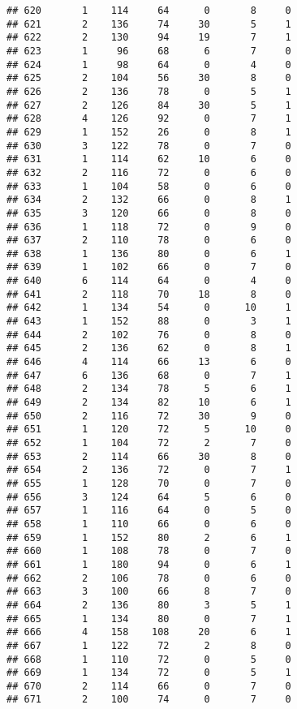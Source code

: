 \documentclass[
]{article}
\begin{document}
\begin{verbatim}
## 620       1    114     64      0       8     0
## 621       2    136     74     30       5     1
## 622       2    130     94     19       7     1
## 623       1     96     68      6       7     0
## 624       1     98     64      0       4     0
## 625       2    104     56     30       8     0
## 626       2    136     78      0       5     1
## 627       2    126     84     30       5     1
## 628       4    126     92      0       7     1
## 629       1    152     26      0       8     1
## 630       3    122     78      0       7     0
## 631       1    114     62     10       6     0
## 632       2    116     72      0       6     0
## 633       1    104     58      0       6     0
## 634       2    132     66      0       8     1
## 635       3    120     66      0       8     0
## 636       1    118     72      0       9     0
## 637       2    110     78      0       6     0
## 638       1    136     80      0       6     1
## 639       1    102     66      0       7     0
## 640       6    114     64      0       4     0
## 641       2    118     70     18       8     0
## 642       1    134     54      0      10     1
## 643       1    152     88      0       3     1
## 644       2    102     76      0       8     0
## 645       2    136     62      0       8     1
## 646       4    114     66     13       6     0
## 647       6    136     68      0       7     1
## 648       2    134     78      5       6     1
## 649       2    134     82     10       6     1
## 650       2    116     72     30       9     0
## 651       1    120     72      5      10     0
## 652       1    104     72      2       7     0
## 653       2    114     66     30       8     0
## 654       2    136     72      0       7     1
## 655       1    128     70      0       7     0
## 656       3    124     64      5       6     0
## 657       1    116     64      0       5     0
## 658       1    110     66      0       6     0
## 659       1    152     80      2       6     1
## 660       1    108     78      0       7     0
## 661       1    180     94      0       6     1
## 662       2    106     78      0       6     0
## 663       3    100     66      8       7     0
## 664       2    136     80      3       5     1
## 665       1    134     80      0       7     1
## 666       4    158    108     20       6     1
## 667       1    122     72      2       8     0
## 668       1    110     72      0       5     0
## 669       1    134     72      0       5     1
## 670       2    114     66      0       7     0
## 671       2    100     74      0       7     0

\end{verbatim}
\end{document}
